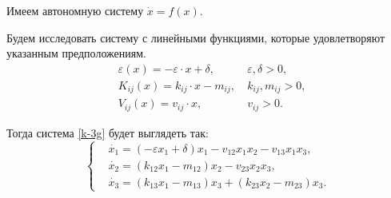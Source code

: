     Имеем автономную систему \( \dot{x} = f(x) \).

    Будем исследовать систему с линейными функциями, которые удовлетворяют указанным предположениям.
    \[
        \begin{split}
            & \varepsilon(x) = -\varepsilon \cdot x + \delta, & ~ \varepsilon, \delta > 0, \\
            & K_{ij} (x) = k_{ij} \cdot x - m_{ij}, & ~ k_{ij}, m_{ij} > 0, \\
            & V_{ij} (x) = v_{ij} \cdot x, & ~ v_{ij} > 0. 
        \end{split}
    \]

    Тогда система \eqref{k-3g} будет выглядеть так:
    \begin{equation}
        \left\{\begin{split}
            & \dot{x_1} = \left( -\varepsilon x_1 + \delta \right)x_1 - v_{12} x_1 x_2 - v_{13} x_1 x_3, \\
            & \dot{x_2} = \left( k_{12} x_1 - m_{12} \right)x_2 - v_{23} x_2 x_3, \\
            & \dot{x_3} = \left( k_{13} x_1 - m_{13} \right)x_3 + \left( k_{23} x_2 - m_{23} \right)x_3. 
        \end{split}\right. \label{k-3l}
    \end{equation}